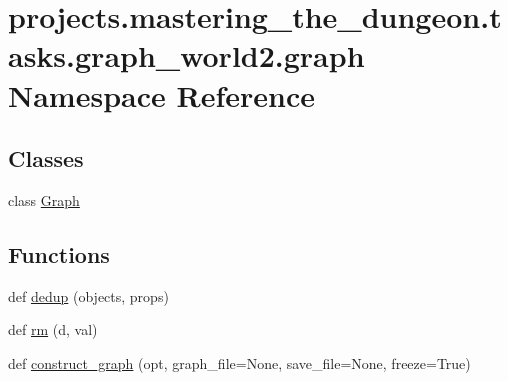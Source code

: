\hypertarget{namespaceprojects_1_1mastering__the__dungeon_1_1tasks_1_1graph__world2_1_1graph}{}\section{projects.\+mastering\+\_\+the\+\_\+dungeon.\+tasks.\+graph\+\_\+world2.\+graph Namespace Reference}
\label{namespaceprojects_1_1mastering__the__dungeon_1_1tasks_1_1graph__world2_1_1graph}
\subsection*{Classes}
\begin{DoxyCompactItemize}
\item 
class \hyperlink{classprojects_1_1mastering__the__dungeon_1_1tasks_1_1graph__world2_1_1graph_1_1Graph}{Graph}
\end{DoxyCompactItemize}
\subsection*{Functions}
\begin{DoxyCompactItemize}
\item 
def \hyperlink{namespaceprojects_1_1mastering__the__dungeon_1_1tasks_1_1graph__world2_1_1graph_aacedda0df87e368472433505f6775190}{dedup} (objects, props)
\item 
def \hyperlink{namespaceprojects_1_1mastering__the__dungeon_1_1tasks_1_1graph__world2_1_1graph_a0da062d03bdfbab1c65ea71371c0c469}{rm} (d, val)
\item 
def \hyperlink{namespaceprojects_1_1mastering__the__dungeon_1_1tasks_1_1graph__world2_1_1graph_a5cd70dc74f0447a0dda626d8c524b4c9}{construct\+\_\+graph} (opt, graph\+\_\+file=None, save\+\_\+file=None, freeze=True)
\end{DoxyCompactItemize}
